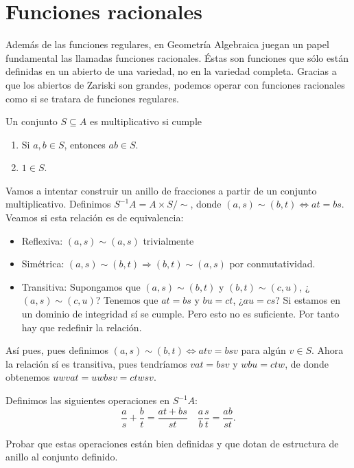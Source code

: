 \documentclass[ACGA.tex]{subfiles}
\begin{document}
\section{Funciones racionales}

Además de las funciones regulares, en Geometría Algebraica juegan un papel fundamental las llamadas funciones racionales. Éstas son funciones que sólo están definidas en un abierto de una variedad, no en la variedad completa. Gracias a que los abiertos de Zariski son grandes, podemos operar con funciones racionales como si se tratara de funciones regulares.

\begin{defi}
Un conjunto $S\subseteq A$ es multiplicativo si cumple
\begin{enumerate}
\item Si $a,b\in S$, entonces $ab\in S$.
\item $1\in S$.
\end{enumerate}
\end{defi}

Vamos a intentar construir un anillo de fracciones a partir de un conjunto multiplicativo. Definimos $S^{-1}A=A\times S/\sim$, donde $(a,s)\sim (b,t)\Leftrightarrow at=bs$. Veamos si esta relación es de equivalencia:
\begin{itemize}
\item Reflexiva: $(a,s)\sim (a,s)$ trivialmente
\item Simétrica: $(a,s)\sim (b,t)\Rightarrow (b,t)\sim (a,s)$ por conmutatividad.
\item Transitiva: Supongamos que $(a,s)\sim (b,t)$ y $(b,t)\sim (c,u)$, ¿$(a,s)\sim (c,u)$? Tenemos que $at=bs$ y $bu=ct$, ¿$au=cs$? Si estamos en un dominio de integridad sí se cumple. Pero esto no es suficiente. Por tanto hay que redefinir la relación.
\end{itemize}

Así pues, pues definimos $(a,s)\sim (b,t)\Leftrightarrow atv=bsv$ para algún $v\in S$. Ahora la relación sí es transitiva, pues tendríamos $vat=bsv$ y $wbu=ctw$, de donde obtenemos $uwvat=uwbsv=ctwsv$. 

Definimos las siguientes operaciones en $S^{-1}A$:
$$\frac{a}{s}+\frac{b}{t}=\frac{at+bs}{st}\quad \frac{a}{b}\frac{s}{t}=\frac{ab}{st}.$$

\begin{ejer}
Probar que estas operaciones están bien definidas y que dotan de estructura de anillo al conjunto definido.
\end{ejer}
\end{document}
